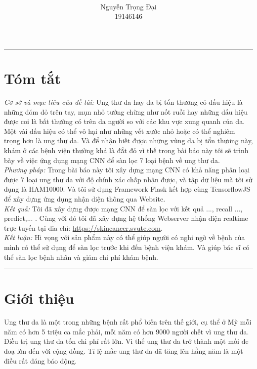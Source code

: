 \documentclass[12pt,a4paper]{article}
\title{
	\centering\normalsize  
	\vspace{-0.7in}
	\colorbox{black}{\parbox{\linewidth}{\textcolor{white}{\hfill\HCMUTE \hfill}}} \\[0.5ex]
	\begin{minipage}{\dimexpr0.5\linewidth-0.5\wlogo}\oriart\end{minipage}%
	\begin{minipage}{\dimexpr0.5\linewidth+0.5\wlogo-6pt}\LOGO \end{minipage}\\[0.5ex]
	\colorbox{black}{\parbox{\linewidth}{\textcolor{white}{\hfill\KHCMUTE\hfill}}}\\[1ex]
	\titleofArt
}
\author{Nguyễn Trọng Đại\\19146146}
\date{}
\begin{document}
	\maketitle
	\thispagestyle{Initial}
	\noindent
	\rule{\textwidth}{0.4pt}
	
	\section*{Tóm tắt}
	
	\textit{Cơ sở và mục tiêu của đề tài:} Ung thư da hay da bị tổn thương có dấu hiệu là những đóm đỏ trên tay, mụn nhỏ tưởng chừng như nốt ruồi hay những dấu hiệu được coi là bất thường có trên da người so với các khu vực xung quanh của da. Một vài dấu hiệu có thể vô hại như những vết xước nhỏ hoặc có thể nghiêm trọng hơn là ung thư da. Và để nhận biết được những vùng da bị tổn thương này, khám ở các bệnh viện thường khá là đắt đỏ vì thế trong bài báo này tôi sẽ trình bày về việc ứng dụng mạng CNN để sàn lọc 7 loại bệnh về ung thư da.\\
	
	\noindent
	\textit{Phương pháp:} Trong bài báo này tôi xây dựng mạng CNN có khả năng phân loại được 7 loại ung thư da với độ chính xác chấp nhận được, và tập dữ liệu mà tôi sử dụng là HAM10000. Và tôi sử dụng Framework Flask kết hợp cùng TensorflowJS để xây dựng ứng dụng nhận diện thông qua Website.\\
	
	\noindent
	\textit{Kết quả:} Tôi đã xây dựng được mạng CNN để sàn lọc với kết quả ..., recall ..., predict,... . Cùng với đó tôi đã xây dựng hệ thống Webserver nhận diện realtime trực tuyến tại đia chỉ: \href{https://skincancer.svute.com}{https://skincancer.svute.com}.\\
	
	\noindent
	\textit{Kết luận:} Hi vọng với sản phẩm này có thể giúp người có nghi ngờ về bệnh của mình có thể sử dụng để sàn lọc trước khi đến bệnh viện khám. Và giúp bác sĩ có thể sàn lọc bệnh nhân và giảm chi phí khám bệnh.
	
	\hfill \break
	\noindent
	\rule{\textwidth}{0.4pt}
	
	\section{Giới thiệu}
	Ung thư da là một trong những bệnh rất phổ biến trên thế giới, cụ thể ở Mỹ mỗi năm có hơn 5 triệu ca mắc phải, mỗi năm có hơn 9000 người chết vì ung thư da. Điều trị ung thư da tốn chi phí rất lớn. Vì thế ung thư da trở thành một mối đe doạ lớn đến với cộng đồng. Tỉ lệ mắc ung thư da đã tăng lên hằng năm là một điều rất đáng báo động.\\
	
\end{document}
